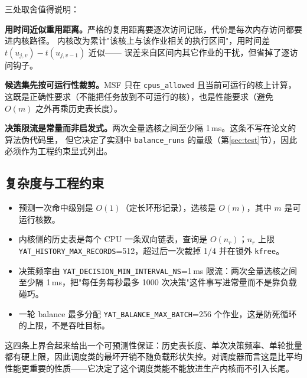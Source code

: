 三处取舍值得说明：

\textbf{用时间近似重用距离。}严格的复用距离要逐次访问记账，代价是每次内存访问都要进内核路径。
内核改为累计"该核上与该作业相关的执行区间"，用时间差 $t(u_{j,v})-t(u_{j,v-1})$ 近似——
误差来自区间内其它作业的干扰，但省掉了逐访问钩子。

\textbf{候选集先按可运行性裁剪。}MSF 只在 \texttt{cpus\_allowed} 且当前可运行的核上计算，
这既是正确性要求（不能把任务放到不可运行的核），也是性能要求（避免 $O(m)$ 之外再乘历史表长度）。

\textbf{决策限流是常量而非启发式。}两次全量选核之间至少隔 1\,ms。这条不写在论文的算法伪代码里，
但它决定了实测中 \texttt{balance\_runs} 的量级（第\ref{sec:test}节），因此必须作为工程约束显式列出。

\subsection{复杂度与工程约束}

\begin{itemize}
  \item 预测一次命中级别是 $O(1)$（定长环形记录），选核是 $O(m)$，其中 $m$ 是可运行核数。
  \item 内核侧的历史表是每个 CPU 一条双向链表，查询是 $O(n_r)$；$n_r$ 上限 \texttt{YAT\_HISTORY\_MAX\_RECORDS}=512，超过后一次裁掉 1/4 并在锁外 \texttt{kfree}。
  \item 决策频率由 \texttt{YAT\_DECISION\_MIN\_INTERVAL\_NS}=1\,ms 限流：两次全量选核之间至少隔 1\,ms，把"每任务每秒最多 1000 次决策"这件事写进常量而不是靠负载碰巧。
  \item 一轮 balance 最多分配 \texttt{YAT\_BALANCE\_MAX\_BATCH}=256 个作业，这是防死循环的上限，不是吞吐目标。
\end{itemize}

这四条上界合起来给出一个可预测性保证：历史表长度、单次决策频率、单轮批量都有硬上限，因此调度类的最坏开销不随负载形状失控。对调度器而言这是比平均性能更重要的性质——它决定了这个调度类能不能放进生产内核而不引入长尾。